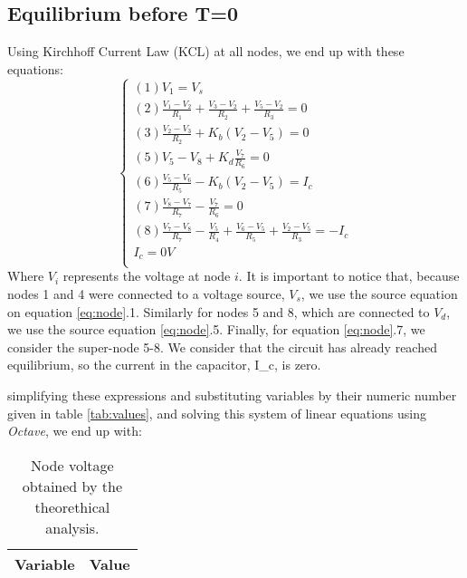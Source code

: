 \subsection{Equilibrium before T=0}
Using Kirchhoff Current Law (KCL) at all nodes, we end up with these equations:
\begin{equation}\label{eq:node}
  \begin{cases}
    (1) V_1 = V_s \\
    (2) \frac{V_1 - V_2}{R_1} + \frac{V_3 - V_2}{R_2} + \frac{V_5 - V_2}{R_3} = 0 \\
    (3) \frac{V_2 - V_3}{R_2} + K_b(V_2 - V_5) = 0 \\
    (5) V_5 - V_8 + K_d\frac{V_7}{R_6} = 0 \\
    (6) \frac{V_5 - V_6}{R_5} - K_b(V_2-V_5) = I_c \\
    (7) \frac{V_8 - V_7}{R_7} - \frac{V_7}{R_6} = 0 \\
    (8) \frac{V_7 - V_8}{R_7} - \frac{V_5}{R_4} + \frac{V_6 - V_5}{R_5} + \frac{V_2 - V_5}{R_3} = -I_c \\
    I_c = 0V \\
  \end{cases}
\end{equation}
Where $V_i$ represents the voltage at node $i$. It is important to notice that, because nodes 1 and 4 were connected to a voltage source, $V_s$, we use the source equation on equation \ref{eq:node}.1. Similarly for nodes 5 and 8, which are connected to $V_d$, we use the source equation \ref{eq:node}.5. Finally, for equation \ref{eq:node}.7, we consider the super-node 5-8. We consider that the circuit has already reached equilibrium, so the current in the capacitor, I_c, is zero.
\par
simplifying these expressions and substituting variables by their numeric number given in table \ref{tab:values}, and solving this system of linear equations using \textit{Octave}, we end up with:
\begin{table}[H]
  \centering
  \begin{tabular}{|l|r|}
    \hline    
    {\bf Variable} & {\bf Value} \\ \hline
    
  \end{tabular}
  \caption{Node voltage obtained by the theorethical analysis.}
  \label{tab:node}
\end{table}
\par

